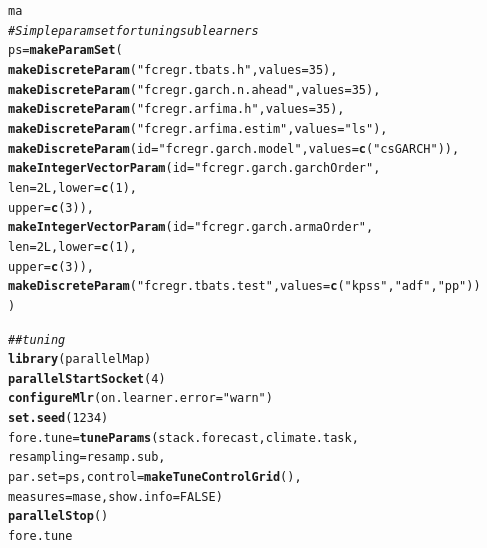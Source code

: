 \documentclass{article}\usepackage[]{graphicx}\usepackage[]{color}
\makeatletter
\newcommand{\hlnum}[1]{\textcolor[rgb]{0.686,0.059,0.569}{#1}}%
\newcommand{\hlstr}[1]{\textcolor[rgb]{0.192,0.494,0.8}{#1}}%
\newcommand{\hlcom}[1]{\textcolor[rgb]{0.678,0.584,0.686}{\textit{#1}}}%
\newcommand{\hlstd}[1]{\textcolor[rgb]{0.345,0.345,0.345}{#1}}%
\newcommand{\hlkwb}[1]{\textcolor[rgb]{0.69,0.353,0.396}{#1}}%
\newcommand{\hlkwc}[1]{\textcolor[rgb]{0.333,0.667,0.333}{#1}}%
\newcommand{\hlkwd}[1]{\textcolor[rgb]{0.737,0.353,0.396}{\textbf{#1}}}%
\newenvironment{kframe}{%
 \def\at@end@of@kframe{}%
 \ifinner\ifhmode%
  \def\at@end@of@kframe{\end{minipage}}%
  \begin{minipage}{\columnwidth}%
 \fi\fi%
 \def\FrameCommand##1{\hskip\@totalleftmargin \hskip-\fboxsep
 \colorbox{shadecolor}{##1}\hskip-\fboxsep
     \hskip-\linewidth \hskip-\@totalleftmargin \hskip\columnwidth}%
 \MakeFramed {\advance\hsize-\width
   \@totalleftmargin\z@ \linewidth\hsize
   \@setminipage}}%
 {\par\unskip\endMakeFramed%
 \at@end@of@kframe}
\newenvironment{knitrout}{}{} %
\theoremstyle{definition}
\makeatother
\begin{document}
\begin{knitrout}
\color{fgcolor}\begin{kframe}
\begin{alltt}
\hlstd{ma}
\hlcom{# Simple param set for tuning sub learners}
\hlstd{ps} \hlkwb{=} \hlkwd{makeParamSet}\hlstd{(}
  \hlkwd{makeDiscreteParam}\hlstd{(}\hlstr{"fcregr.tbats.h"}\hlstd{,} \hlkwc{values} \hlstd{=} \hlnum{35}\hlstd{),}
  \hlkwd{makeDiscreteParam}\hlstd{(}\hlstr{"fcregr.garch.n.ahead"}\hlstd{,} \hlkwc{values} \hlstd{=} \hlnum{35}\hlstd{),}
  \hlkwd{makeDiscreteParam}\hlstd{(}\hlstr{"fcregr.arfima.h"}\hlstd{,} \hlkwc{values} \hlstd{=} \hlnum{35}\hlstd{),}
  \hlkwd{makeDiscreteParam}\hlstd{(}\hlstr{"fcregr.arfima.estim"}\hlstd{,} \hlkwc{values} \hlstd{=} \hlstr{"ls"}\hlstd{),}
  \hlkwd{makeDiscreteParam}\hlstd{(}\hlkwc{id} \hlstd{=} \hlstr{"fcregr.garch.model"}\hlstd{,} \hlkwc{values} \hlstd{=} \hlkwd{c}\hlstd{(}\hlstr{"csGARCH"}\hlstd{)),}
  \hlkwd{makeIntegerVectorParam}\hlstd{(}\hlkwc{id} \hlstd{=} \hlstr{"fcregr.garch.garchOrder"}\hlstd{,}
                         \hlkwc{len} \hlstd{=} \hlnum{2L}\hlstd{,} \hlkwc{lower} \hlstd{=} \hlkwd{c}\hlstd{(}\hlnum{1}\hlstd{),}
                         \hlkwc{upper} \hlstd{=} \hlkwd{c}\hlstd{(}\hlnum{3}\hlstd{)),}
  \hlkwd{makeIntegerVectorParam}\hlstd{(}\hlkwc{id} \hlstd{=} \hlstr{"fcregr.garch.armaOrder"}\hlstd{,}
                         \hlkwc{len} \hlstd{=} \hlnum{2L}\hlstd{,} \hlkwc{lower} \hlstd{=} \hlkwd{c}\hlstd{(}\hlnum{1}\hlstd{),}
                         \hlkwc{upper} \hlstd{=} \hlkwd{c}\hlstd{(}\hlnum{3}\hlstd{)),}
  \hlkwd{makeDiscreteParam}\hlstd{(}\hlstr{"fcregr.tbats.test"}\hlstd{,} \hlkwc{values} \hlstd{=} \hlkwd{c}\hlstd{(}\hlstr{"kpss"}\hlstd{,}\hlstr{"adf"}\hlstd{,}\hlstr{"pp"}\hlstd{))}
\hlstd{)}

\hlcom{## tuning}
\hlkwd{library}\hlstd{(parallelMap)}
\hlkwd{parallelStartSocket}\hlstd{(}\hlnum{4}\hlstd{)}
\hlkwd{configureMlr}\hlstd{(}\hlkwc{on.learner.error} \hlstd{=} \hlstr{"warn"}\hlstd{)}
\hlkwd{set.seed}\hlstd{(}\hlnum{1234}\hlstd{)}
\hlstd{fore.tune} \hlkwb{=} \hlkwd{tuneParams}\hlstd{(stack.forecast, climate.task,}
                       \hlkwc{resampling} \hlstd{= resamp.sub,}
                       \hlkwc{par.set} \hlstd{= ps,} \hlkwc{control} \hlstd{=} \hlkwd{makeTuneControlGrid}\hlstd{(),}
                       \hlkwc{measures} \hlstd{= mase,} \hlkwc{show.info} \hlstd{=} \hlnum{FALSE}\hlstd{)}
\hlkwd{parallelStop}\hlstd{()}
\hlstd{fore.tune}
\end{alltt}
\end{kframe}
\end{knitrout}
\end{document}
